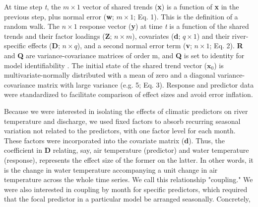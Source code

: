 \documentclass[notitlepage]{article}
\begin{document}
At time step {\it t}, the $m \times 1$ vector of shared trends (\textbf{x}) is a function of \textbf{x} in the previous step, plus normal error (\textbf{w}; $m\times 1$; Eq. 1). This is the definition of a random walk. The $n\times 1$ response vector (\textbf{y}) at time {\it t} is a function of the shared trends and their factor loadings (\textbf{Z}; $n\times m$), covariates (\textbf{d}; $q\times 1$) and their river-specific effects (\textbf{D}; $n\times q$), and a second normal error term (\textbf{v}; $n\times 1$; Eq. 2). \textbf{R} and \textbf{Q} are variance-covariance matrices of order m, and \textbf{Q} is set to identity for model identifiability \citep{harvey1990forecasting}. The initial state of the shared trend vector ($\bm{x}_0$) is multivariate-normally distributed with a mean of zero and a diagonal variance-covariance matrix with large variance (e.g. 5; Eq. 3). Response and predictor data were standardized to facilitate comparison of effect sizes and avoid error inflation.


Because we were interested in isolating the effects of climatic predictors on river temperature and discharge, we used fixed factors to absorb recurring seasonal variation not related to the predictors, with one factor level for each month. These factors were incorporated into the covariate matrix (\textbf{d}). Thus, the coefficient in \textbf{D} relating, say, air temperature (predictor) and water temperature (response), represents the effect size of the former on the latter. In other words, it is the change in water temperature accompanying a unit change in air temperature across the whole time series. We call this relationship "coupling." We were also interested in coupling by month for specific predictors, which required that the focal predictor in a particular model be arranged seasonally. Concretely,
\end{document}
